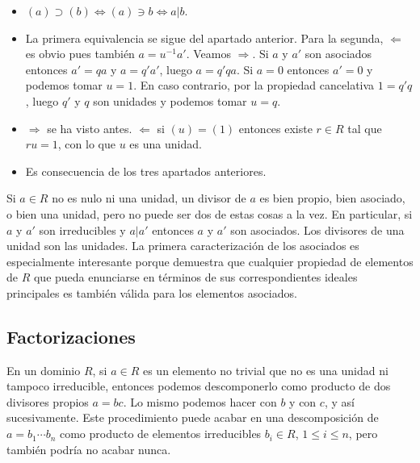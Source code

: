 

\begin{itemize}
\item
  \((a)\supset (b)\Leftrightarrow (a)\ni b\Leftrightarrow a|b\).
\item
  La primera equivalencia se sigue del apartado anterior. Para la
  segunda, \(\Leftarrow\) es obvio pues también \(a=u^{-1}a'\). Veamos
  \(\Rightarrow\). Si \(a\) y \(a'\) son asociados entonces \(a'=qa\) y
  \(a=q'a'\), luego \(a=q'qa\). Si \(a=0\) entonces \(a'=0\) y podemos
  tomar \(u=1\). En caso contrario, por la propiedad cancelativa
  \(1=q'q\), luego \(q'\) y \(q\) son unidades y podemos tomar \(u=q\).
\item
  \(\Rightarrow\) se ha visto antes. \(\Leftarrow\) si \((u)=(1)\)
  entonces existe \(r\in R\) tal que \(ru=1\), con lo que \(u\) es una
  unidad.
\item
  Es consecuencia de los tres apartados anteriores.
\end{itemize}



Si \(a\in R\) no es nulo ni una unidad, un divisor de \(a\) es bien
propio, bien asociado, o bien una unidad, pero no puede ser dos de estas
cosas a la vez. En particular, si \(a\) y \(a'\) son irreducibles y
\(a|a'\) entonces \(a\) y \(a'\) son asociados. Los divisores de una
unidad son las unidades. La primera caracterización de los asociados es
especialmente interesante porque demuestra que cualquier propiedad de
elementos de \(R\) que pueda enunciarse en términos de sus
correspondientes ideales principales es también válida para los
elementos asociados. 

\hypertarget{factorizaciones}{%
\subsection{Factorizaciones}\label{factorizaciones}}

En un dominio \(R\), si \(a\in R\) es un elemento no trivial que no es
una unidad ni tampoco irreducible, entonces podemos descomponerlo como
producto de dos divisores propios \(a=bc\). Lo mismo podemos hacer con
\(b\) y con \(c\), y así sucesivamente. Este procedimiento puede acabar
en una descomposición de \(a=b_1\cdots b_n\) como producto de
elementos irreducibles \(b_i\in R\), \(1\leq i\leq n\), pero también
podría no acabar nunca.

